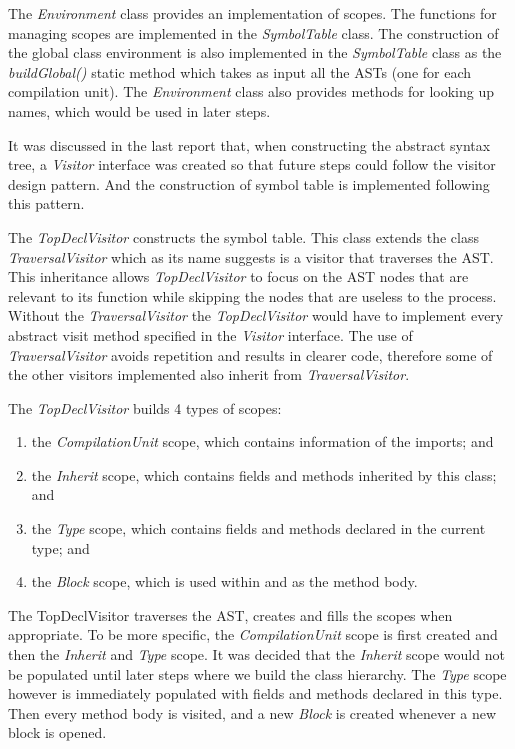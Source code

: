 \documentclass[a4paper, notitlepage]{report}
\begin{document}
The \emph{Environment} class provides an implementation of scopes. The functions for managing scopes are implemented in the \emph{SymbolTable} class. The construction of the global class environment is also implemented in the \emph{SymbolTable} class as the \emph{buildGlobal()} static method which takes as input all the ASTs (one for each compilation unit). The \emph{Environment} class also provides methods for looking up names, which would be used in later steps.

It was discussed in the last report that, when constructing the abstract syntax tree, a \emph{Visitor} interface was created so that future steps could follow the visitor design pattern. And the construction of symbol table is implemented following this pattern.

The \emph{TopDeclVisitor} constructs the symbol table. This class extends the class \emph{TraversalVisitor} which as its name suggests is a visitor that traverses the AST. This inheritance allows \emph{TopDeclVisitor} to focus on the AST nodes that are relevant to its function while skipping the nodes that are useless to the process. Without the \emph{TraversalVisitor} the \emph{TopDeclVisitor} would have to implement every abstract visit method specified in the \emph{Visitor} interface. The use of \emph{TraversalVisitor} avoids repetition and results in clearer code, therefore some of the other visitors implemented also inherit from \emph{TraversalVisitor}.

The \emph{TopDeclVisitor} builds 4 types of scopes: 
\begin{enumerate}
\item the \emph{CompilationUnit} scope, which contains information of the imports; and
\item the \emph{Inherit} scope, which contains fields and methods inherited by this class; and
\item the \emph{Type} scope, which contains fields and methods declared in the current type; and
\item the \emph{Block} scope, which is used within and as the method body.

\end{enumerate}

The TopDeclVisitor traverses the AST, creates and fills the scopes when appropriate. To be more specific, the \emph{CompilationUnit} scope is first created and then the \emph{Inherit} and \emph{Type} scope. It was decided that the \emph{Inherit} scope would not be populated until later steps where we build the class hierarchy. The \emph{Type} scope however is immediately populated with fields and methods declared in this type. Then every method body is visited, and a new \emph{Block} is created whenever a new block is opened. 
\end{document}

